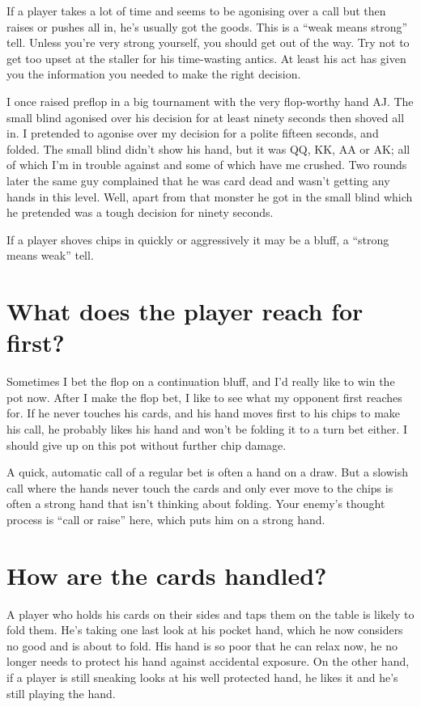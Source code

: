 If a player takes a lot of time and seems to be agonising over a call
but then raises or pushes all in, he's usually got the goods.
This is a ``weak means strong'' tell.
Unless you're very strong yourself, you should get out
of the way. Try not to get too upset at the staller for
his time-wasting antics. At least his act has given you the
information you needed to make the right decision.

I once raised preflop in a big tournament with the very flop-worthy hand
AJ. The small blind agonised over his decision for at least ninety
seconds then shoved all in. I pretended to agonise over my decision
for a polite fifteen seconds, and folded. The small blind didn't show
his hand, but it was QQ, KK, AA or AK; all of which I'm in trouble
against and some of which have me crushed. Two rounds later the same
guy complained that he was card dead and wasn't getting any hands
in this level. Well, apart from that monster he got in the small blind
which he pretended was a tough decision for ninety seconds.

If a player shoves chips in quickly or aggressively it may be a bluff,
a ``strong means weak'' tell.

\section{What does the player reach for first?}

Sometimes I bet the flop on a continuation bluff, and I'd really like
to win the pot now. After I make the flop bet, I like to see what
my opponent first reaches for. If he never touches his cards, and his
hand moves first to his chips to make his call, he probably likes his
hand and won't be folding it to a turn bet either. I should
give up on this pot without further chip damage.

A quick, automatic call of a regular bet is often a hand on a
draw. But a slowish call where the hands never touch the cards and
only ever move to the chips is often a strong hand that isn't thinking
about folding. Your enemy's thought process is ``call or raise'' here,
which puts him on a strong hand.

\section{How are the cards handled?}

A player who holds his cards on their sides and taps them on
the table is likely to fold them. He's taking one last look
at his pocket hand, which he now considers no good and is about
to fold. His hand is so poor that he can relax now, he no longer
needs to protect his hand against accidental exposure.
On the other hand, if a player is still sneaking looks at his
well protected hand, he likes it and he's still playing the hand.

